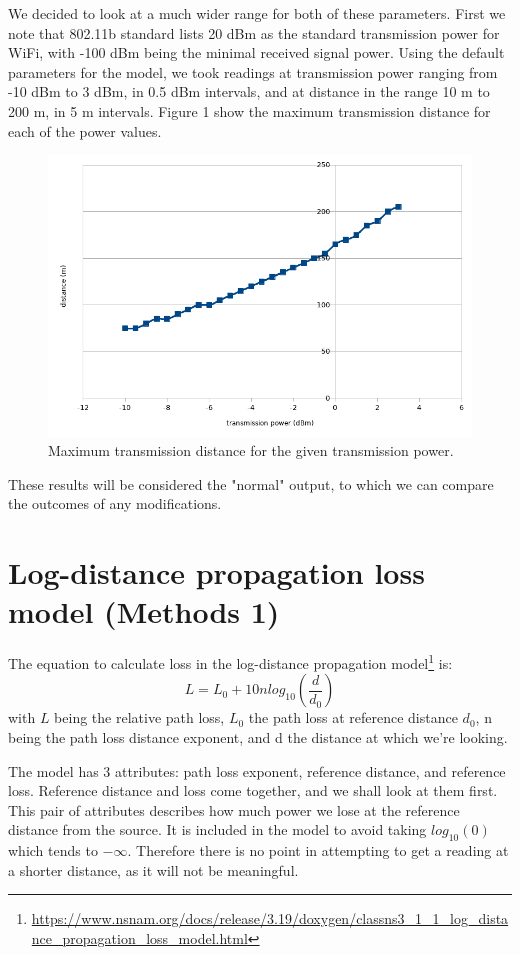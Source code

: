 \documentclass[11pt,journal]{article}
\begin{document}
	We decided to look at a much wider range for both of these parameters. First we note that 802.11b standard lists 20 dBm as the standard transmission power for WiFi, with -100 dBm being the minimal received signal power. Using the default parameters for the model, we took readings at transmission power ranging from -10 dBm to 3 dBm, in 0.5 dBm intervals, and at distance in the range 10 m to 200 m, in 5 m intervals. Figure 1 show the maximum transmission distance for each of the power values.
	
	\begin{figure}[h]
		\centering
		\includegraphics[scale=0.6]{graph_initial.png}
		\caption{Maximum transmission distance for the given transmission power.}
	\end{figure}

	These results will be considered the "normal" output, to which we can compare the outcomes of any modifications.
	
	
	
	\section{Log-distance propagation loss model (Methods 1)}
	The equation to calculate loss in the log-distance propagation model\footnote{\url{https://www.nsnam.org/docs/release/3.19/doxygen/classns3_1_1_log_distance_propagation_loss_model.html}} is:
	\[L = L_0 + 10nlog_{10}(\dfrac{d}{d_0})\] 
	with $L$ being the relative path loss, $L_0$ the path loss at reference distance $d_0$, n being the path loss distance exponent, and d the distance at which we're looking.
	
	The model has 3 attributes: path loss exponent, reference distance, and reference loss. Reference distance and loss come together, and we shall look at them first. This pair of attributes describes how much power we lose at the reference distance from the source. It is included in the model to avoid taking $log_{10}(0)$ which tends to $-\infty$. Therefore there is no point in attempting to get a reading at a shorter distance, as it will not be meaningful. 
	
\end{document}

